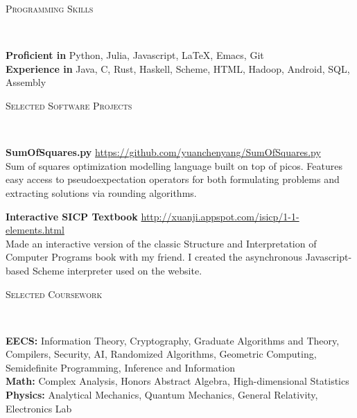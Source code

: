 \documentclass[9pt]{article}
\newenvironment{changemargin}[2]{%
  \begin{list}{}{%
      \setlength{\topsep}{0pt}%
      \setlength{\leftmargin}{#1}%
      \setlength{\rightmargin}{#2}%
      \setlength{\listparindent}{\parindent}%
      \setlength{\itemindent}{\parindent}%
      \setlength{\parsep}{\parskip}%
    }%
  \item[]}{\end{list}
}
\newcommand{\lineover}{
  \begin{changemargin}{-0.05in}{-0.05in}
    \vspace*{-8pt}
    \hrulefill \\
    \vspace*{-2pt}
  \end{changemargin}
}
\newcommand{\header}[1]{
  \begin{changemargin}{-0.5in}{-0.5in}
    \scshape{#1}\\
    \lineover
  \end{changemargin}
}
\newenvironment{body} {
  \vspace*{-16pt}
  \begin{changemargin}{-0.25in}{-0.5in}
  }
  {\end{changemargin}
}
\begin{document}
\header{Programming Skills}

\begin{body}
  \vspace{14pt}
  \textbf{Proficient in} Python, Julia, Javascript, \LaTeX, Emacs, Git\\
  \textbf{Experience in} Java, C, Rust, Haskell, Scheme, HTML, Hadoop, Android, SQL, Assembly
\end{body}

\smallskip

\header{Selected Software Projects}

\begin{body}
  \vspace{14pt}
  \textbf{SumOfSquares.py} \hfill \url{https://github.com/yuanchenyang/SumOfSquares.py} \\
  Sum of squares optimization modelling language built on top of picos. Features
  easy access to pseudoexpectation operators for both formulating problems and
  extracting solutions via rounding algorithms.

  \medskip

  \textbf{Interactive SICP Textbook} \hfill
  \url{http://xuanji.appspot.com/isicp/1-1-elements.html}\\
  Made an interactive version of the classic Structure and Interpretation of
  Computer Programs book with my friend. I created the asynchronous
  Javascript-based Scheme interpreter used on the website. \\
\end{body}

\smallskip


\header{Selected Coursework}
\begin{body}
  \vspace{14pt}
  \textbf{EECS:} Information Theory, Cryptography, Graduate Algorithms and Theory, Compilers, Security, AI, Randomized Algorithms, Geometric Computing, Semidefinite Programming, Inference and Information \\
  \medskip
  \textbf{Math:} Complex Analysis, Honors Abstract Algebra, High-dimensional Statistics\\
  \medskip
  \textbf{Physics:} Analytical Mechanics, Quantum Mechanics, General Relativity, Electronics Lab \\
  \medskip
\end{body}
\end{document}
